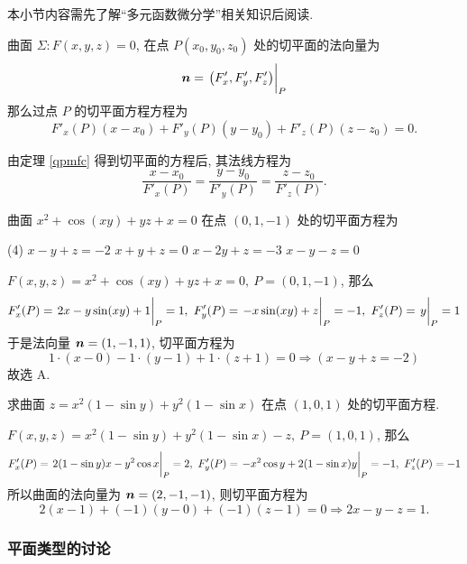 本小节内容需先了解“多元函数微分学”相关知识后阅读.

\begin{theorem}[切平面方程]
    曲面 $\varSigma:F(x,y,z)=0$, 在点 $P(x_0,y_0,z_0)$ 处的切平面的法向量为
    $$\vb*{n}=\eval{\qty(F'_x,F'_y,F'_z)}_{P}$$
    那么过点 $P$ 的切平面方程方程为
    $$F'_x(P)(x-x_0)+F'_y(P)(y-y_0)+F'_z(P)(z-z_0)=0.$$
    \label{qpmfc}
\end{theorem}

\begin{theorem}[法线方程]
    由定理 \ref{qpmfc} 得到切平面的方程后, 其法线方程为 $$\dfrac{x-x_0}{F'_x(P)}=\dfrac{y-y_0}{F'_y(P)}=\dfrac{z-z_0}{F'_z(P)}.$$
\end{theorem}

\begin{example}[2013 数一]
    曲面 $x^2+\cos(xy)+yz+x=0$ 在点 $(0,1,-1)$ 处的切平面方程为
    \begin{tasks}(4)
        \task $x-y+z=-2$
        \task $x+y+z=0$
        \task $x-2y+z=-3$
        \task $x-y-z=0$
    \end{tasks}
\end{example}
\begin{solution}
    $F(x,y,z)=x^2+\cos(xy)+yz+x=0,~P=(0,1,-1)$, 那么
    $$F'_x(P)=\eval{2x-y\sin(xy)+1}_{P}=1,~F'_y(P)=\eval{-x\sin(xy)+z}_{P}=-1,~F'_z(P)=\eval{y}_{P}=1$$
    于是法向量 $\vb*{n}=(1,-1,1)$, 切平面方程为 $$1\cdot(x-0)-1\cdot(y-1)+1\cdot(z+1)=0\Rightarrow(x-y+z=-2)$$
    故选 A.
\end{solution}

\begin{example}[2014 数一]
    求曲面 $z=x^2(1-\sin y)+y^2(1-\sin x)$ 在点 $(1,0,1)$ 处的切平面方程.
\end{example}
\begin{solution}
    $F(x,y,z)=x^2(1-\sin y)+y^2(1-\sin x)-z,~P=(1,0,1)$, 那么
    $$F'_x(P)=\eval{2(1-\sin y)x-y^2\cos x}_{P}=2,~F'_y(P)=\eval{-x^2\cos y+2(1-\sin x)y}_{P}=-1,~F'_z(P)=-1$$
    所以曲面的法向量为 $\vb*{n}=(2,-1,-1)$, 则切平面方程为 $$2(x-1)+(-1)(y-0)+(-1)(z-1)=0\Rightarrow 2x-y-z=1.$$
\end{solution}

\subsubsection{平面类型的讨论}

